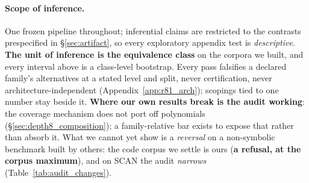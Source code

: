 \paragraph{Scope of inference.} One frozen pipeline throughout; inferential claims are restricted to the contrasts prespecified in \S\ref{sec:artifact}, so every exploratory appendix test is \emph{descriptive}. \textbf{The unit of inference is the equivalence class} on the corpora we built, and every interval above is a class-level bootstrap. Every pass falsifies a declared family's alternatives at a stated level and split, never certification, never architecture-independent (Appendix~\ref{app:r81_arch}); scopings tied to one number stay beside it. \textbf{Where our own results break is the audit working}: the coverage mechanism does not port off polynomials (\S\ref{sec:depth8_composition}); a family-relative bar exists to expose that rather than absorb it. What we cannot yet show is a \emph{reversal} on a non-symbolic benchmark built by others: the code corpus we settle is ours (\textbf{a refusal, at the corpus maximum}), and on SCAN the audit \emph{narrows} (Table~\ref{tab:audit_changes}).
